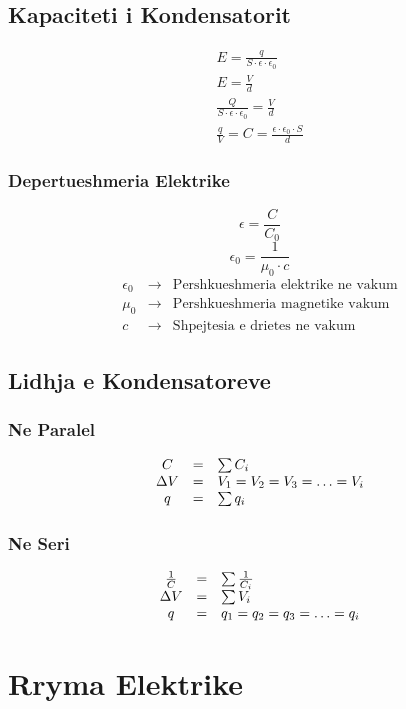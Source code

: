 \documentclass[a4paper, twocolumn]{article}
\begin{document}
\subsection{Kapaciteti i Kondensatorit}
\begin{gather*}
	E = \frac{q}{S\cdot \epsilon \cdot \epsilon_{0}}\\[6pt]
	E = \frac{V}{d} \\[6pt]
	\frac{Q}{S\cdot \epsilon \cdot \epsilon_{0}} = \frac{V}{d}\\[6pt]
	\frac{q}{V} = C = \frac{\epsilon \cdot  \epsilon_{0} \cdot S}{d}
\end{gather*}
\subsubsection{Depertueshmeria Elektrike}
\[
\epsilon = \frac{C}{C_{0}}
\]
\[
\epsilon_{0}=\frac{1}{\mu_{0}\cdot c}
\]
\[
\begin{array}{rcl}
	\epsilon_{0} &\to& \text{Pershkueshmeria elektrike ne vakum}\\
	\mu_{0} &\to& \text{Pershkueshmeria magnetike vakum}\\
	c &\to& \text{Shpejtesia e drietes ne vakum}
\end{array}
\]
\subsection{Lidhja e Kondensatoreve}
\subsubsection{Ne Paralel}
\[
\begin{array}{c c l}
	C&=&\sum C_{i} \\
	\Delta V&=&V_1=V_2=V_3=\ldots=V_i\\
	q&=& \sum q_i
\end{array}
\]
\subsubsection{Ne Seri}
\[
	\begin{array}{c c l}
		\frac{1}{C}&=&\sum \frac{1}{C_{i}}  \\
		\Delta V &=& \sum V_{i}\\
		q&=& q_1=q_2=q_3=\ldots =q_i  \\
\end{array}
\]
\section{Rryma Elektrike}
\end{document}
